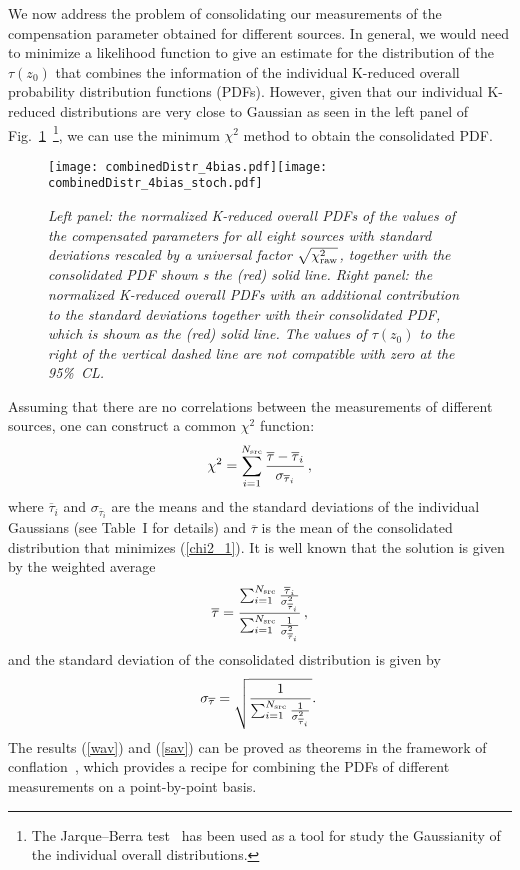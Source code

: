 \documentclass[12pt]{article}
\newcommand{\beq}{\begin{equation}}
\newcommand{\eeq}{\end{equation}}
\begin{document}
{We now address the problem of consolidating our measurements of the compensation parameter obtained for different sources.
In general, we would need to minimize a likelihood function to give an estimate for the distribution of the $\tau (z_0)$ that
combines the information of the individual K-reduced overall probability distribution functions (PDFs). However, given that
our individual K-reduced distributions are very close to Gaussian as seen in the left panel of Fig.~\ref{fig:COMB2}~\footnote{The
Jarque--Berra test~\cite{statBOOK1} has been used as a tool
for study the Gaussianity of the individual overall distributions.},
we can use the minimum $\chi^2$ method to obtain the consolidated PDF.

\begin{figure}
\centering
\texttt{[image: combinedDistr\_4bias.pdf]}\hspace{0cm}\texttt{[image: combinedDistr\_4bias\_stoch.pdf]}
\vspace{-0.4cm}
\caption{\it Left panel: the normalized K-reduced overall PDFs of the values of the compensated parameters
for all eight sources with standard deviations rescaled by a universal factor $\sqrt{\chi_{\rm raw}^2}$,
together with the consolidated PDF shown s the (red) solid line.
Right panel: the normalized K-reduced overall PDFs with an additional contribution to the standard deviations together with their consolidated PDF,
which is shown as the (red) solid line.
The values of $\tau (z_0)$ to the right of the vertical dashed line are not compatible with zero at the 95\%~CL.
}
\label{fig:COMB2}
\end{figure}

Assuming that there are no correlations between the measurements of different sources, one can construct a common $\chi^2$ function:
\beq
\label{chi2_1}
\chi^2=\sum_{i=1}^{N_{\rm src}}\frac{\overline\tau -\overline\tau_i}{\sigma_{\overline\tau_i}} \, ,
\eeq
where $\overline\tau_i$ and $\sigma_{\overline\tau_i}$ are the means and the standard deviations of the individual Gaussians (see Table~I for details)
and $\overline\tau $ is the mean of the consolidated distribution that minimizes (\ref{chi2_1}).
It is well known that the solution is given by the weighted average
\beq
\label{wav}
\overline\tau =\frac{\sum_{i=1}^{N_{\rm src}}\frac{\overline\tau_i}{\sigma_{\overline\tau_i}^2}}
{\sum_{i=1}^{N_{\rm src}}\frac{1}{\sigma_{\overline\tau_i}^2}} \, ,
\eeq
and the standard deviation of the consolidated distribution is given by
\beq
\label{sav}
\sigma_{\overline\tau } = \sqrt{\frac{1}{\sum_{i=1}^{N_{\rm src}}\frac{1}{\sigma_{\overline\tau_i}^2}}}. \,
\eeq
The results (\ref{wav}) and (\ref{sav}) can be proved as theorems in the framework of conflation~\cite{conflation}, which
provides a recipe for combining the PDFs of different measurements on a point-by-point basis.

}
\end{document}
